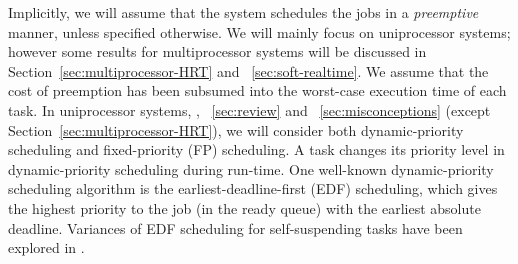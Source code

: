 



Implicitly, we will assume that the system schedules the jobs in a
\emph{preemptive} manner, unless specified otherwise.  We will mainly focus on
uniprocessor systems; however some results for multiprocessor systems
will be discussed in Section~\ref{sec:multiprocessor-HRT} and
\mysectionref{}~\ref{sec:soft-realtime}. 
We assume that the cost of preemption
has been subsumed into the worst-case execution time of each task. In
uniprocessor systems, \ie, \mysectionref{}~\ref{sec:review} and
\mysectionref{}~\ref{sec:misconceptions} (except Section~\ref{sec:multiprocessor-HRT}), we will consider both
dynamic-priority scheduling and fixed-priority (FP)
scheduling. A task changes its priority level in dynamic-priority
scheduling during run-time. One well-known dynamic-priority scheduling
algorithm is the earliest-deadline-first (EDF) scheduling, which gives
the highest priority to the job (in the ready queue) with the earliest
absolute deadline. Variances of EDF scheduling for self-suspending
tasks have been explored in
\cite{RTSS-ChenL14,Liu_2014,DBLP:conf/ecrts/Devi03,WC16-suspend-DATE}.

